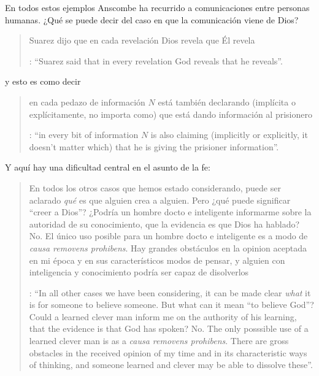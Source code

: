 En todos estos ejemplos Anscombe ha recurrido a comunicaciones entre personas humanas. ¿Qué se puede decir del caso en que la comunicación viene de Dios? \blockquote[{\Cite[118]{anscombe1981erp:faith}}: \enquote{Suarez said that in every revelation God reveals that he reveals}.]{Suarez dijo que en cada revelación Dios revela que Él revela} y esto es como decir \blockquote[{\Cite[118]{anscombe1981erp:faith}}: \enquote{in every bit of information $N$ is also claiming (implicitly or explicitly, it doesn't matter which) that he is giving the prisioner information}.]{en cada pedazo de información $N$ está también declarando (implícita o explícitamente, no importa como) que está dando información al prisionero}. Y aquí hay una dificultad central en el asunto de la fe: \blockquote[{\Cite[118]{anscombe1981erp:faith}}: \enquote{In all other cases we have been considering, it can be made clear \emph{what} it is for someone to believe someone. But what can it mean ``to believe God''? Could a learned clever man inform me on the authority of his learning, that the evidence is that God has spoken? No. The only posssible use of a learned clever man is as a \emph{causa removens prohibens}. There are gross obstacles in the received opinion of my time and in its characteristic ways of thinking, and someone learned and clever may be able to dissolve these}.]{En todos los otros casos que hemos estado considerando, puede ser aclarado \emph{qué} es que alguien crea a alguien. Pero ¿qué puede significar ``creer a Dios''? ¿Podría un hombre docto e inteligente informarme sobre la autoridad de su conocimiento, que la evidencia es que Dios ha hablado? No. El único uso posible para un hombre docto e inteligente es a modo de \emph{causa removens prohibens}. Hay grandes obstáculos en la opinion aceptada en mi época y en sus característicos modos de pensar, y alguien con inteligencia y conocimiento podría ser capaz de disolverlos}.

